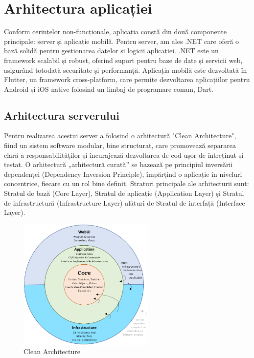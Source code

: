 \chapter{Arhitectura aplicației}

Conform cerințelor non-funcționale, aplicația constă din două componente principale: server și aplicație mobilă. Pentru server, am ales .NET care oferă o bază solidă pentru gestionarea datelor și logicii aplicației. .NET este un framework scalabil și robust, oferind suport pentru baze de date și servicii web, asigurând totodată securitate și performanță. Aplicația mobilă este dezvoltată în Flutter, un framework cross-platform, care permite dezvoltarea aplicațiilor pentru Android și iOS native folosind un limbaj de programare comun, Dart.

\section{Arhitectura serverului}

Pentru realizarea acestui server a folosind o arhitectură "Clean Architecture", fiind un sistem software modular, bine structurat, care promovează separarea clară a responsabilităților și încurajează dezvoltarea de cod ușor de întreținut și testat.
O arhitectură „arhitectură curată” se bazează pe principiul inversării dependenței (Dependency Inversion Principle), împărțind o aplicație în niveluri concentrice, fiecare cu un rol bine definit. Straturi principale ale arhitecturii sunt: Stratul de bază (Core Layer), Stratul de aplicație (Application Layer) și Stratul de infrastructură (Infrastructure Layer) alături de Stratul de interfață (Interface Layer).

\begin{figure}[ht]
    \centering
    \includegraphics[width=0.6\textwidth] {images/clean_architecture.png}
    \caption{Clean Architecture{\cite{clean_architecture}}}
    \label{fig:clean_architecture}
\end{figure}

